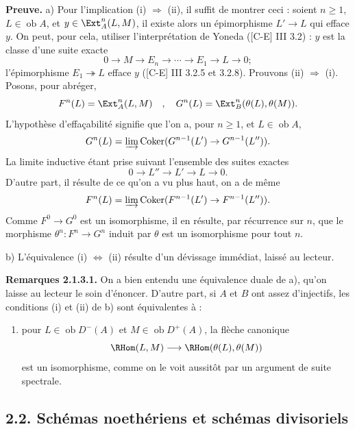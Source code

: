 \noindent\textbf{Preuve.} a) Pour l'implication (i) $\Rightarrow$ (ii), il suffit de montrer ceci : soient $n \geq 1$, $L \in \operatorname{ob} A$, et $y \in \Ext_A^n(L,M)$, il existe alors un \'{e}pimorphisme $L' \rightarrow L$ qui efface $y$. On peut, pour cela, utiliser l'interpr\'{e}tation de Yoneda ([C-E] III 3.2) : $y$ est la classe d'une suite exacte
\[
0 \longrightarrow M \longrightarrow E_n \longrightarrow \cdots \longrightarrow E_1 \longrightarrow L \longrightarrow 0 ;
\]
l'\'{e}pimorphisme $E_1 \twoheadrightarrow L$ efface $y$ ([C-E] III 3.2.5 et 3.2.8). Prouvons (ii) $\Rightarrow$ (i). Posons, pour abr\'{e}ger,
\[
F^n(L) = \Ext_A^n(L,M) \quad , \quad G^n(L) = \Ext_B^n(\theta(L), \theta(M)) .
\]
L'hypoth\`{e}se d'effa\c{c}abilit\'{e} signifie que l'on a, pour $n \geq 1$, et $L \in \operatorname{ob} A$,
\[
G^n(L) = \varinjlim \operatorname{Coker}(G^{n-1}(L') \rightarrow G^{n-1}(L'')) .
\]
La limite inductive \'{e}tant prise suivant l'ensemble des suites exactes
\[
0 \longrightarrow L'' \longrightarrow L' \longrightarrow L \longrightarrow 0 .
\]
D'autre part, il r\'{e}sulte de ce qu'on a vu plus haut, on a de m\^{e}me
\[
F^n(L) = \varinjlim \operatorname{Coker}(F^{n-1}(L') \rightarrow F^{n-1}(L'')) .
\]
Comme $F^0 \rightarrow G^0$ est un isomorphisme, il en r\'{e}sulte, par r\'{e}currence sur $n$, que le morphisme $\theta^n : F^n \rightarrow G^n$ induit par $\theta$ est un isomorphisme pour tout $n$.

b) L'\'{e}quivalence (i) $\Leftrightarrow$ (ii) r\'{e}sulte d'un d\'{e}vissage imm\'{e}diat, laiss\'{e} au lecteur.

\smallskip
\noindent\textbf{Remarques 2.1.3.1.} On a bien entendu une \'{e}quivalence duale de a), qu'on laisse au lecteur le soin d'\'{e}noncer. D'autre part, si $A$ et $B$ ont assez d'injectifs, les conditions (i) et (ii) de b) sont \'{e}quivalentes \`{a} :
\begin{enumerate}
\item[(iii)] pour $L \in \operatorname{ob} D^-(A)$ et $M \in \operatorname{ob} D^+(A)$, la fl\`{e}che canonique
\[
\RHom(L,M) \longrightarrow \RHom(\theta(L), \theta(M))
\]
est un isomorphisme, comme on le voit aussit\^{o}t par un argument de suite spectrale.
\end{enumerate}

\subsection*{2.2. Sch\'{e}mas noeth\'{e}riens et sch\'{e}mas divisoriels}

